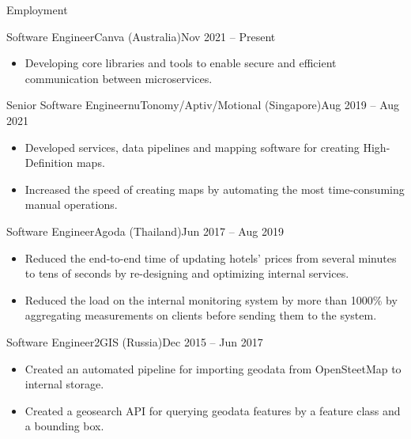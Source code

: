 \documentclass[]{cv}
\begin{document}
	\makeheader

	\begin{cvsection}{Employment}
    \begin{cvsubsection}{Software Engineer}{Canva (Australia)}{Nov 2021 -- Present}
        \begin{itemize}
            \item Developing core libraries and tools to enable secure and efficient communication between microservices.
        \end{itemize}
    \end{cvsubsection}

    \begin{cvsubsection}{Senior Software Engineer}{nuTonomy/Aptiv/Motional (Singapore)}{Aug 2019 -- Aug 2021}
        \begin{itemize}
            \item Developed services, data pipelines and mapping software for creating High-Definition maps.
            \item Increased the speed of creating maps by automating the most time-consuming manual operations.
        \end{itemize}
    \end{cvsubsection}


    \begin{cvsubsection}{Software Engineer}{Agoda (Thailand)}{Jun 2017 -- Aug 2019}
			\begin{itemize}
				\item Reduced the end-to-end time of updating hotels' prices from several minutes to tens of seconds by re-designing and optimizing internal services.
				\item Reduced the load on the internal monitoring system by more than 1000\% by aggregating measurements on clients before sending them to the system.
			\end{itemize}
		\end{cvsubsection}

    \begin{cvsubsection}{Software Engineer}{2GIS (Russia)}{Dec 2015 -- Jun 2017}
			\begin{itemize}
				\item Created an automated pipeline for importing geodata from OpenSteetMap to internal storage.
				\item Created a geosearch API for querying geodata features by a feature class and a bounding box.
			\end{itemize}
		\end{cvsubsection}


\end{cvsection}
\end{document}
